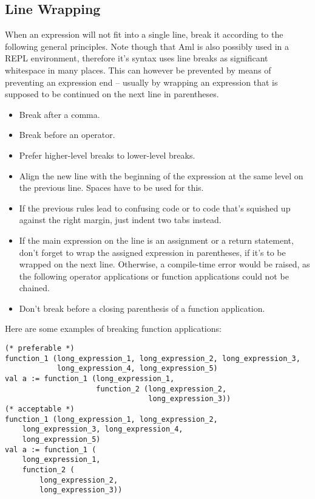 \subsection{Line Wrapping}

When an expression will not fit into a single line, break it according to the following general principles. Note though that Aml is also possibly used in a REPL environment, therefore it's syntax uses line breaks as significant whitespace in many places. This can however be prevented by means of preventing an expression end -- usually by wrapping an expression that is supposed to be continued on the next line in parentheses. 

\begin{itemize}
\item Break after a comma. 
\item Break before an operator. 
\item Prefer higher-level breaks to lower-level breaks. 
\item Align the new line with the beginning of the expression at the same level on the previous line. Spaces have to be used for this. 
\item If the previous rules lead to confusing code or to code that's squished up against the right margin, just indent two tabs instead. 
\item If the main expression on the line is an assignment or a return statement, don't forget to wrap the assigned expression in parentheses, if it's to be wrapped on the next line. Otherwise, a compile-time error would be raised, as the following operator applications or function applications could not be chained. 
\item Don't break before a closing parenthesis of a function application.  
\end{itemize}

\example Here are some examples of breaking function applications: 

\begin{lstlisting}
(* preferable *)
function_1 (long_expression_1, long_expression_2, long_expression_3,
            long_expression_4, long_expression_5)
val a := function_1 (long_expression_1,
                     function_2 (long_expression_2,
                                 long_expression_3))
(* acceptable *)
function_1 (long_expression_1, long_expression_2, 
    long_expression_3, long_expression_4, 
    long_expression_5)
val a := function_1 (
    long_expression_1,
    function_2 (
        long_expression_2,
        long_expression_3))
\end{lstlisting}

